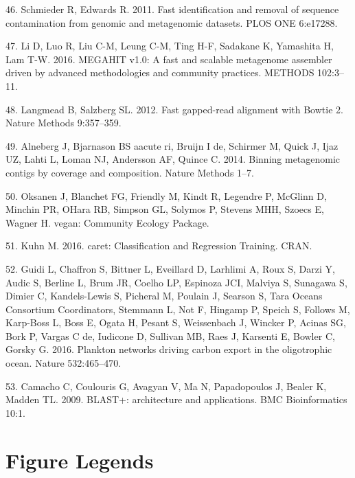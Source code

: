 \documentclass[12pt,]{article}
\begin{document}
\hypertarget{ref-Schmieder:2011fo}{}
46. Schmieder R, Edwards R. 2011. Fast identification and removal of
sequence contamination from genomic and metagenomic datasets. PLOS ONE
6:e17288.

\hypertarget{ref-Li:2016kd}{}
47. Li D, Luo R, Liu C-M, Leung C-M, Ting H-F, Sadakane K, Yamashita H,
Lam T-W. 2016. MEGAHIT v1.0: A fast and scalable metagenome assembler
driven by advanced methodologies and community practices. METHODS
102:3--11.

\hypertarget{ref-Langmead:2012jh}{}
48. Langmead B, Salzberg SL. 2012. Fast gapped-read alignment with
Bowtie 2. Nature Methods 9:357--359.

\hypertarget{ref-Alneberg:2014fc}{}
49. Alneberg J, Bjarnason BS aacute ri, Bruijn I de, Schirmer M, Quick
J, Ijaz UZ, Lahti L, Loman NJ, Andersson AF, Quince C. 2014. Binning
metagenomic contigs by coverage and composition. Nature Methods 1--7.

\hypertarget{ref-veganCommunityEco:xdLliqSE}{}
50. Oksanen J, Blanchet FG, Friendly M, Kindt R, Legendre P, McGlinn D,
Minchin PR, OHara RB, Simpson GL, Solymos P, Stevens MHH, Szoecs E,
Wagner H. vegan: Community Ecology Package.

\hypertarget{ref-caretClassificatio:ux5fU2Litux5f1}{}
51. Kuhn M. 2016. caret: Classification and Regression Training. CRAN.

\hypertarget{ref-Guidi:2016kf}{}
52. Guidi L, Chaffron S, Bittner L, Eveillard D, Larhlimi A, Roux S,
Darzi Y, Audic S, Berline L, Brum JR, Coelho LP, Espinoza JCI, Malviya
S, Sunagawa S, Dimier C, Kandels-Lewis S, Picheral M, Poulain J, Searson
S, Tara Oceans Consortium Coordinators, Stemmann L, Not F, Hingamp P,
Speich S, Follows M, Karp-Boss L, Boss E, Ogata H, Pesant S, Weissenbach
J, Wincker P, Acinas SG, Bork P, Vargas C de, Iudicone D, Sullivan MB,
Raes J, Karsenti E, Bowler C, Gorsky G. 2016. Plankton networks driving
carbon export in the oligotrophic ocean. Nature 532:465--470.

\hypertarget{ref-Camacho:2009fc}{}
53. Camacho C, Coulouris G, Avagyan V, Ma N, Papadopoulos J, Bealer K,
Madden TL. 2009. BLAST+: architecture and applications. BMC
Bioinformatics 10:1.

\newpage

\section{Figure Legends}\label{figure-legends}
\end{document}
